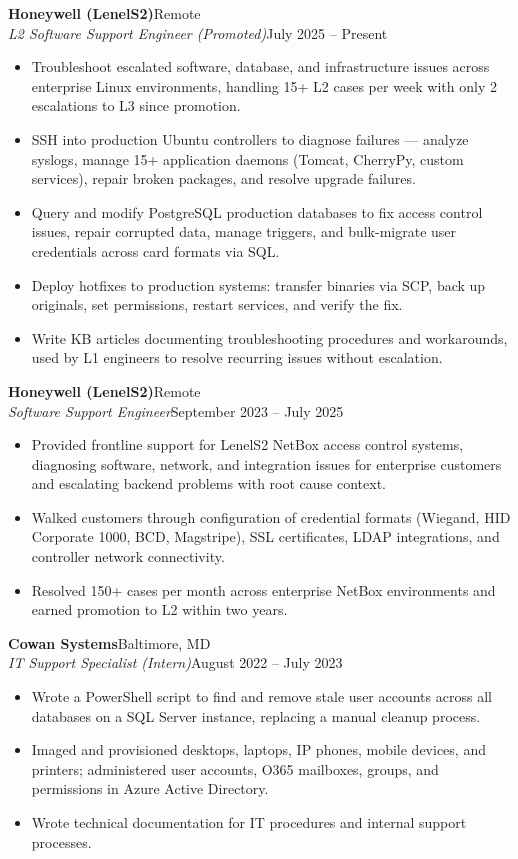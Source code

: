 \documentclass[9.5pt, letterpaper]{extarticle}
\newcommand{\roleheader}[4]{%
  \vspace{4pt}
  \noindent\textbf{#1}\hfill#2\\
  \textit{#3}\hfill#4
  \vspace{1pt}
}
\begin{document}
\roleheader{Honeywell (LenelS2)}{Remote}{L2 Software Support Engineer (Promoted)}{July 2025 -- Present}
\begin{itemize}
  \item Troubleshoot escalated software, database, and infrastructure issues across enterprise Linux environments, handling 15+ L2 cases per week with only 2 escalations to L3 since promotion.
  \item SSH into production Ubuntu controllers to diagnose failures --- analyze syslogs, manage 15+ application daemons (Tomcat, CherryPy, custom services), repair broken packages, and resolve upgrade failures.
  \item Query and modify PostgreSQL production databases to fix access control issues, repair corrupted data, manage triggers, and bulk-migrate user credentials across card formats via SQL.
  \item Deploy hotfixes to production systems: transfer binaries via SCP, back up originals, set permissions, restart services, and verify the fix.
  \item Write KB articles documenting troubleshooting procedures and workarounds, used by L1 engineers to resolve recurring issues without escalation.
\end{itemize}

\roleheader{Honeywell (LenelS2)}{Remote}{Software Support Engineer}{September 2023 -- July 2025}
\begin{itemize}
  \item Provided frontline support for LenelS2 NetBox access control systems, diagnosing software, network, and integration issues for enterprise customers and escalating backend problems with root cause context.
  \item Walked customers through configuration of credential formats (Wiegand, HID Corporate 1000, BCD, Magstripe), SSL certificates, LDAP integrations, and controller network connectivity.
  \item Resolved 150+ cases per month across enterprise NetBox environments and earned promotion to L2 within two years.
\end{itemize}

\roleheader{Cowan Systems}{Baltimore, MD}{IT Support Specialist (Intern)}{August 2022 -- July 2023}
\begin{itemize}
  \item Wrote a PowerShell script to find and remove stale user accounts across all databases on a SQL Server instance, replacing a manual cleanup process.
  \item Imaged and provisioned desktops, laptops, IP phones, mobile devices, and printers; administered user accounts, O365 mailboxes, groups, and permissions in Azure Active Directory.
  \item Wrote technical documentation for IT procedures and internal support processes.
\end{itemize}
\end{document}
